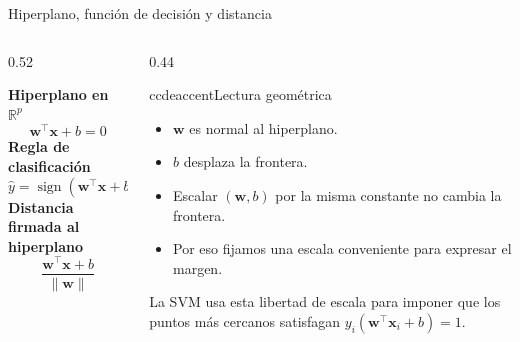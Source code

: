 \begin{frame}{Hiperplano, función de decisión y distancia}
\footnotesize
\begin{columns}[T,onlytextwidth]
\begin{column}{0.52\textwidth}
\begin{ccdebox}
\centering
\textbf{Hiperplano en $\mathbb{R}^p$}
\[
\mathbf{w}^{\top}\mathbf{x}+b=0
\]
\textbf{Regla de clasificación}
\[
\hat y=\operatorname{sign}(\mathbf{w}^{\top}\mathbf{x}+b)
\]
\textbf{Distancia firmada al hiperplano}
\[
\frac{\mathbf{w}^{\top}\mathbf{x}+b}{\|\mathbf{w}\|}
\]
\end{ccdebox}
\end{column}
\begin{column}{0.44\textwidth}
\begin{contrastbox}{ccdeaccent}{Lectura geométrica}
\footnotesize
\begin{itemize}
  \item $\mathbf{w}$ es normal al hiperplano.
  \item $b$ desplaza la frontera.
  \item Escalar $(\mathbf{w},b)$ por la misma constante no cambia la frontera.
  \item Por eso fijamos una escala conveniente para expresar el margen.
\end{itemize}
\end{contrastbox}
\vspace{0.16cm}
\begin{keybox}
La SVM usa esta libertad de escala para imponer que los puntos más cercanos satisfagan $y_i(\mathbf{w}^\top\mathbf{x}_i+b)=1$.
\end{keybox}
\end{column}
\end{columns}
\end{frame}

